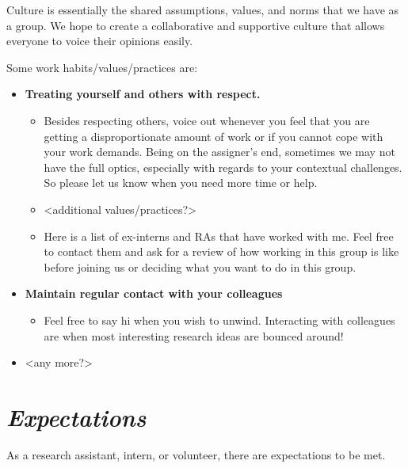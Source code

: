 \documentclass[
]{book}
\providecommand{\tightlist}{%
  \setlength{\itemsep}{0pt}\setlength{\parskip}{0pt}}
\begin{document}
Culture is essentially the shared assumptions, values, and norms that we have as a group. We hope to create a collaborative and supportive culture that allows everyone to voice their opinions easily.

Some work habits/values/practices are:

\begin{itemize}
\item
  \textbf{Treating yourself and others with respect.}

  \begin{itemize}
  \item
    Besides respecting others, voice out whenever you feel that you are getting a disproportionate amount of work or if you cannot cope with your work demands. Being on the assigner's end, sometimes we may not have the full optics, especially with regards to your contextual challenges. So please let us know when you need more time or help.
  \item
    \textless additional values/practices?\textgreater{}
  \item
    Here is a list of ex-interns and RAs that have worked with me. Feel free to contact them and ask for a review of how working in this group is like before joining us or deciding what you want to do in this group.
  \end{itemize}
\item
  \textbf{Maintain regular contact with your colleagues}

  \begin{itemize}
  \tightlist
  \item
    Feel free to say hi when you wish to unwind. Interacting with colleagues are when most interesting research ideas are bounced around!
  \end{itemize}
\item
  \textless any more?\textgreater{}
\end{itemize}

\hypertarget{expectations}{%
\section{\texorpdfstring{\emph{Expectations}}{Expectations}}\label{expectations}}

As a research assistant, intern, or volunteer, there are expectations to be met.
\end{document}
